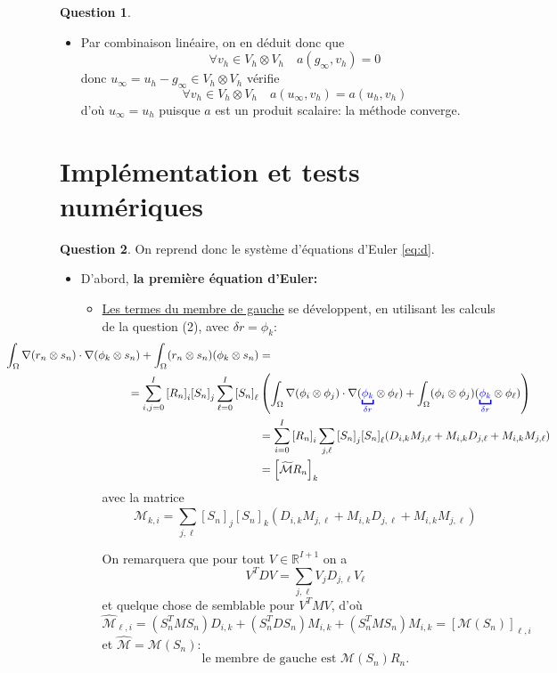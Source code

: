 \documentclass[11pt]{article}
\newcommand{\RR}{\mathbb{R}}
\theoremstyle{definition}
\newtheorem{ques}{Question}
\begin{document}
\begin{ques}
\begin{itemize}
\item Par combinaison linéaire, on en déduit donc que
\[
\forall v_h\in V_h\otimes V_h\quad
a(g_\infty,v_h) = 0
\]
donc $u_\infty = u_h - g_\infty\in V_h\otimes V_h$ vérifie
\[
\forall v_h\in V_h\otimes V_h\quad
a(u_\infty,v_h) = a(u_h,v_h)
\]
d'où $\boxed{u_\infty = u_h}$ puisque $a$ est un produit scalaire: la méthode converge.
\end{itemize}

\end{ques}

\section{Implémentation et tests numériques}

\begin{ques}On reprend donc le système d'équations d'Euler \eqref{eq:d}.

\begin{itemize}
\item D'abord, \textbf{la première équation d'Euler:}

\begin{itemize}
\item \underline{Les termes du membre de gauche} se développent, en utilisant les calculs de la question (2), avec $\delta r=\phi_k$:
\begin{align*}\hspace*{-3cm}
\int_\Omega \nabla(r_n\otimes s_n)\cdot\nabla(\phi_k \otimes s_n) + \int_\Omega (r_n\otimes s_n)(\phi_k\otimes s_n)
&=  \\
=
\sum_{i,j=0}^I {[R_n]}_i{[S_n]}_j\sum_{\ell=0}^I {[S_n]}_\ell &\left( \int_\Omega\nabla(\phi_i\otimes\phi_j)\cdot\nabla({\color{blue} \underbracket{\phi_k}_{\delta r}} \otimes\phi_\ell) + \int_\Omega(\phi_i\otimes\phi_j)({\color{blue} \underbracket{\phi_k}_{\delta r}} \otimes\phi_\ell)\right) \\
&= \sum_{i=0}^I {[R_n]}_i\sum_{j,\ell} {[S_n]}_j {[S_n]}_\ell(D_{i,k}M_{j,\ell} + M_{i,k}D_{j,\ell}+ M_{i,k}M_{j,\ell}) \\
&= {\left[\widetilde{\mathcal{M}}R_n\right]}_k
\end{align*}
avec la matrice
\[
\widehat{\mathcal{M}}_{k,i} = 
\sum_{j,\ell} {[S_n]}_j {[S_n]}_k(D_{i,k}M_{j,\ell} + M_{i,k}D_{j,\ell}+ M_{i,k}M_{j,\ell})
\]

On remarquera que pour tout $V\in\RR^{I+1}$ on a
\[
V^TDV = \sum_{j,\ell} V_jD_{j,\ell}V_\ell
\]
et quelque chose de semblable pour $V^TMV$, d'où
\[
\widehat{\mathcal{M}}_{\ell,i} = (S_n^TMS_n)D_{i,k} + (S_n^TDS_n)M_{i,k} + (S_n^TMS_n)M_{i,k} = \left[\mathcal{M}(S_n)\right]_{\ell,i}
\]
et $\widehat{\mathcal{M}} = \mathcal{M}(S_n)$:
\[
\boxed{\text{le membre de gauche est }\mathcal{M}(S_n)R_n.}
\]


\end{itemize}
\end{itemize}
\end{ques}
\end{document}
